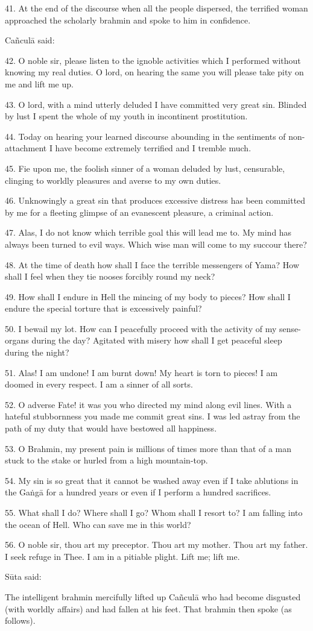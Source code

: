41. At the end of the discourse when all the people dispersed, the terrified
woman approached the scholarly brahmin and spoke to him in confidence.

Cañculā said:

42. O noble sir, please listen to the ignoble activities which I performed
without knowing my real duties. O lord, on hearing the same you will please take
pity on me and lift me up.

43. O lord, with a mind utterly deluded I have committed very great sin. Blinded
by lust I spent the whole of my youth in incontinent prostitution.

44. Today on hearing your learned discourse abounding in the sentiments of
non-attachment I have become extremely terrified and I tremble much.

45. Fie upon me, the foolish sinner of a woman deluded by lust, censurable,
clinging to worldly pleasures and averse to my own duties.

46. Unknowingly a great sin that produces excessive distress has been committed
by me for a fleeting glimpse of an evanescent pleasure, a criminal action.

47. Alas, I do not know which terrible goal this will lead me to. My mind has
always been turned to evil ways. Which wise man will come to my succour there?

48. At the time of death how shall I face the terrible messengers of Yama? How
shall I feel when they tie nooses forcibly round my neck?

49. How shall I endure in Hell the mincing of my body to pieces? How shall I
endure the special torture that is excessively painful?

50. I bewail my lot. How can I peacefully proceed with the activity of my
sense-organs during the day? Agitated with misery how shall I get peaceful sleep
during the night?

51. Alas! I am undone! I am burnt down! My heart is torn to pieces! I am doomed
in every respect. I am a sinner of all sorts.

52. O adverse Fate! it was you who directed my mind along evil lines. With a
hateful stubbornness you made me commit great sins. I was led astray from the
path of my duty that would have bestowed all happiness.

53. O Brahmin, my present pain is millions of times more than that of a man
stuck to the stake or hurled from a high mountain-top.

54. My sin is so great that it cannot be washed away even if I take ablutions in
the Gaṅgā for a hundred years or even if I perform a hundred sacrifices.

55. What shall I do? Where shall I go? Whom shall I resort to? I am falling into
the ocean of Hell. Who can save me in this world?

56. O noble sir, thou art my preceptor. Thou art my mother. Thou art my father.
I seek refuge in Thee. I am in a pitiable plight. Lift me; lift me.

Sūta said:

The intelligent brahmin mercifully lifted up Cañculā who had become disgusted
(with worldly affairs) and had fallen at his feet. That brahmin then spoke
(as follows).
